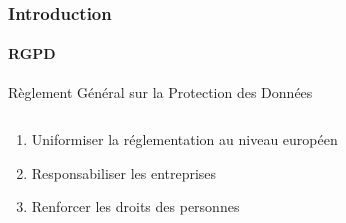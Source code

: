 \documentclass[aspectratio=169]{beamer}
\begin{document}
\begin{frame}
    \frametitle{Introduction}
    \framesubtitle{RGPD}
    \begin{center}
        Règlement Général sur la Protection des Données
    \end{center}
    \begin{columns}
        \begin{column}{.45\textwidth}
            \parbox[c][0.6\textheight][c]{\columnwidth}{
                \begin{center}
                    \begin{enumerate}
                        \item<2-> Uniformiser la réglementation au niveau européen
                        \item<3-> Responsabiliser les entreprises
                        \item<4-> Renforcer les droits des personnes
                    \end{enumerate}
                \end{center}
            }
        \end{column}
        \begin{column}{.5\textwidth}
            \parbox[c][0.6\textheight][c]{\columnwidth}{
                \begin{center}
                \end{center}
            }
        \end{column}
    \end{columns}
\end{frame}
\end{document}
